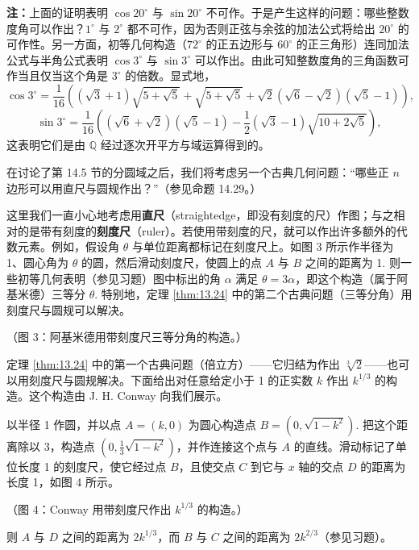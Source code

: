 \noindent\textbf{注：}上面的证明表明 \(\cos 20^\circ\) 与 \(\sin 20^\circ\) 不可作。于是产生这样的问题：哪些整数度角可以作出？\(1^\circ\) 与 \(2^\circ\) 都不可作，因为否则正弦与余弦的加法公式将给出 \(20^\circ\) 的可作性。另一方面，初等几何构造（\(72^\circ\) 的正五边形与 \(60^\circ\) 的正三角形）连同加法公式与半角公式表明 \(\cos 3^\circ\) 与 \(\sin 3^\circ\) 可以作出。由此可知整数度角的三角函数可作当且仅当这个角是 \(3^\circ\) 的倍数。显式地，
\[
\cos 3^\circ = \frac{1}{16}\left((\sqrt{3}+1)\sqrt{5+\sqrt{5}}+\sqrt{5+\sqrt{5}}+\sqrt{2}(\sqrt{6}-\sqrt{2})(\sqrt{5}-1)\right),
\]
\[
\sin 3^\circ = \frac{1}{16}\left((\sqrt{6}+\sqrt{2})(\sqrt{5}-1)-\frac{1}{2}(\sqrt{3}-1)\sqrt{10+2\sqrt{5}}\right),
\]
这表明它们是由 \(\mathbb{Q}\) 经过逐次开平方与域运算得到的。

在讨论了第 14.5 节的分圆域之后，我们将考虑另一个古典几何问题：“哪些正 \(n\) 边形可以用直尺与圆规作出？”（参见命题 14.29。）

这里我们一直小心地考虑用\textbf{直尺}（straightedge，即没有刻度的尺）作图；与之相对的是带有刻度的\textbf{刻度尺}（ruler）。若使用带刻度的尺，就可以作出许多额外的代数元素。例如，假设角 \(\theta\) 与单位距离都标记在刻度尺上。如图 3 所示作半径为 1、圆心角为 \(\theta\) 的圆，然后滑动刻度尺，使圆上的点 \(A\) 与 \(B\) 之间的距离为 1. 则一些初等几何表明（参见习题）图中标出的角 \(\alpha\) 满足 \(\theta = 3\alpha\)，即这个构造（属于阿基米德）三等分 \(\theta\). 特别地，定理 \ref{thm:13.24} 中的第二个古典问题（三等分角）用刻度尺与圆规可以解决。

\begin{center}（图 3：阿基米德用带刻度尺三等分角的构造。）\end{center}

定理 \ref{thm:13.24} 中的第一个古典问题（倍立方）——它归结为作出 \(\sqrt[3]{2}\)——也可以用刻度尺与圆规解决。下面给出对任意给定小于 1 的正实数 \(k\) 作出 \(k^{1/3}\) 的构造。这个构造由 J. H. Conway 向我们展示。

以半径 1 作圆，并以点 \(A = (k, 0)\) 为圆心构造点 \(B = (0, \sqrt{1-k^2})\). 把这个距离除以 3，构造点 \((0, \frac{1}{3}\sqrt{1-k^2})\)，并作连接这个点与 \(A\) 的直线。滑动标记了单位长度 1 的刻度尺，使它经过点 \(B\)，且使交点 \(C\) 到它与 \(x\) 轴的交点 \(D\) 的距离为长度 1，如图 4 所示。

\begin{center}（图 4：Conway 用带刻度尺作出 \(k^{1/3}\) 的构造。）\end{center}

则 \(A\) 与 \(D\) 之间的距离为 \(2k^{1/3}\)，而 \(B\) 与 \(C\) 之间的距离为 \(2k^{2/3}\)（参见习题）。

